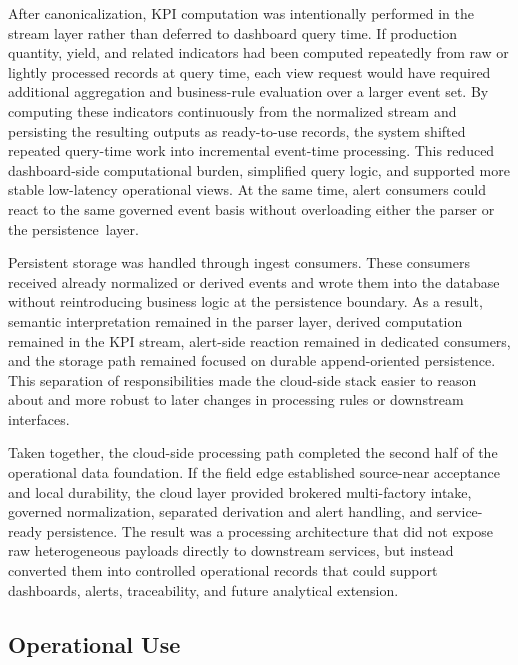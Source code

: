 \documentclass[systems,article,accept,pdftex,moreauthors]{Definitions/mdpi}
\begin{document}
 


After canonicalization, KPI computation was intentionally performed in the stream layer rather than deferred to dashboard query time. If production quantity, yield, and related indicators had been computed repeatedly from raw or lightly processed records at query time, each view request would have required additional aggregation and business-rule evaluation over a larger event set. By computing these indicators continuously from the normalized stream and persisting the resulting outputs as ready-to-use records, the system shifted repeated query-time work into incremental event-time processing. This reduced dashboard-side computational burden, simplified query logic, and supported more stable low-latency operational views. At the same time, alert consumers could react to the same governed event basis without overloading either the parser or the \mbox{persistence layer}.

Persistent storage was handled through ingest consumers. These consumers received already normalized or derived events and wrote them into the database without reintroducing business logic at the persistence boundary. As a result, semantic interpretation remained in the parser layer, derived computation remained in the KPI stream, alert-side reaction remained in dedicated consumers, and the storage path remained focused on durable append-oriented persistence. This separation of responsibilities made the cloud-side stack easier to reason about and more robust to later changes in processing rules or downstream interfaces.

Taken together, the cloud-side processing path completed the second half of the operational data foundation. If the field edge established source-near acceptance and local durability, the cloud layer provided brokered multi-factory intake, governed normalization, separated derivation and alert handling, and service-ready persistence. The result was a processing architecture that did not expose raw heterogeneous payloads directly to downstream services, but instead converted them into controlled operational records that could support dashboards, alerts, traceability, and future analytical extension.



\subsection{Operational Use}
\label{sec:operational_use}
\end{document}
